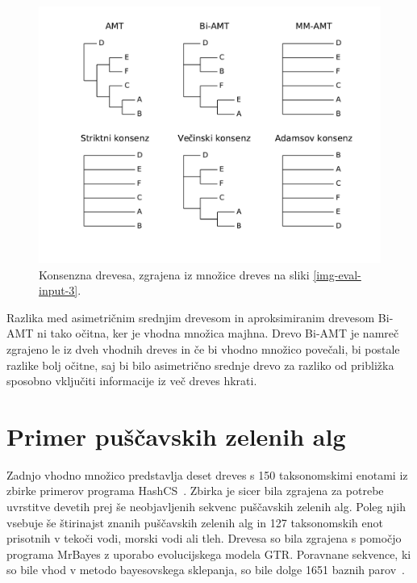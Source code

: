 \documentclass[a4paper, 12pt]{book}
\begin{document}
\begin{figure}
	\begin{center}
		\includegraphics[scale=0.6, clip=true, trim=1.5cm 1.5cm 1cm 0.8cm]{gfx/eval_gfx_3.pdf}
	\end{center}
	\caption{Konsenzna drevesa, zgrajena iz množice dreves na sliki \ref{img-eval-input-3}.}
	\label{img-eval-result-3}
\end{figure}

Razlika med asimetričnim srednjim drevesom in aproksimiranim drevesom Bi-AMT ni 
tako očitna, ker je vhodna množica majhna. Drevo Bi-AMT je namreč zgrajeno le 
iz dveh vhodnih dreves in če bi vhodno množico povečali, bi postale razlike 
bolj očitne, saj bi bilo asimetrično srednje drevo za razliko od približka sposobno
vključiti informacije iz več dreves hkrati.

\section{Primer puščavskih zelenih alg}
Zadnjo vhodno množico predstavlja deset dreves s 150 taksonomskimi enotami iz 
zbirke primerov programa HashCS~\cite{hashcs}. Zbirka je sicer bila zgrajena 
za potrebe uvrstitve devetih prej še neobjavljenih sekvenc puščavskih zelenih alg.
Poleg njih vsebuje še štirinajst znanih puščavskih zelenih alg in 127 taksonomskih 
enot prisotnih v tekoči vodi, morski vodi ali tleh. Drevesa so bila zgrajena s 
pomočjo programa MrBayes z uporabo evolucijskega modela GTR. Poravnane sekvence, 
ki so bile vhod v metodo bayesovskega sklepanja, so bile dolge 1651 baznih parov~\cite{taxa150}.
\end{document}
